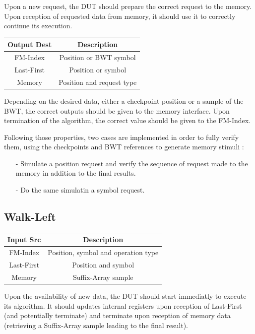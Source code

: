 Upon a new request, the DUT should prepare the correct request to the memory. Upon reception of requested data from memory, it should use it to correctly continue its execution.

\begin{center}
\begin{tabular}{|c|c|}
\hline
  Output Dest   &  Description \\
  \hline
   FM-Index  & Position or BWT symbol \\
   Last-First & Position or symbol \\
   Memory & Position and request type \\
   \hline
\end{tabular}
\end{center}

Depending on the desired data, either a checkpoint position or a sample of the BWT, the correct outputs should be given to the memory interface. Upon termination of the algorithm, the correct value should be given to the FM-Index.

Following those properties, two cases are implemented in order to fully verify them, using the checkpoints and BWT references to generate memory stimuli :
\begin{itemize}
    \item [-] Simulate a position request and verify the sequence of request made to the memory in addition to the final results. 
    \item [-] Do the same simulatin a symbol request.
\end{itemize}
\subsection{Walk-Left}

\vspace*{3mm}
\begin{center}
    \begin{tabular}{|c|c|}
\hline
  Input Src   &  Description \\
  \hline
   FM-Index  & Position, symbol and operation type \\
   Last-First & Position and symbol \\
   Memory & Suffix-Array sample \\
   \hline
\end{tabular}
\end{center}
\vspace*{5mm}

Upon the availability of new data, the DUT should start immediatly to execute its algorithm. It should updates internal registers upon reception of Last-First (and potentially terminate) and terminate upon reception of memory data (retrieving a Suffix-Array sample leading to the final result).

